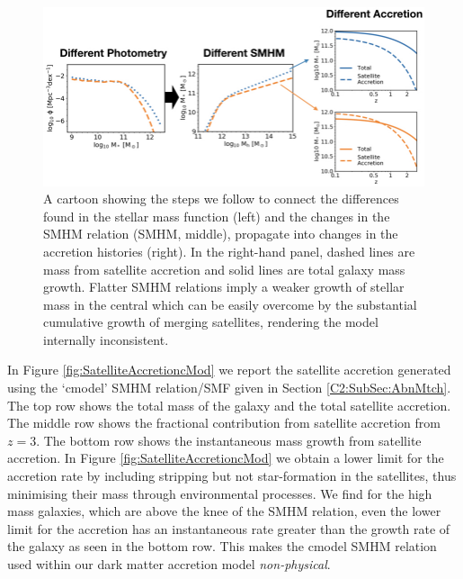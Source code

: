 \begin{figure}[h]
    \centering
    \includegraphics[width = \linewidth]{Figures/Chapter4/SMFtoAccretion.jpeg}
    \caption{A cartoon showing the steps we follow to connect the differences found in the stellar mass function (left) and the changes in the SMHM relation (SMHM, middle), propagate into changes in the accretion histories (right). In the right-hand panel, dashed lines are mass from satellite accretion and solid lines are total galaxy mass growth. Flatter SMHM relations imply a weaker growth of stellar mass in the central which can be easily overcome by the substantial cumulative growth of merging satellites, rendering the model internally inconsistent.}
    \label{fig:SMFtoAcc}
\end{figure}

In Figure \ref{fig:SatelliteAccretioncMod} we report the satellite accretion generated using the `cmodel' SMHM relation/SMF given in Section \ref{C2:SubSec:AbnMtch}. 
The top row shows the total mass of the galaxy and the total satellite accretion. The middle row shows the fractional contribution from satellite accretion from $z = 3$. The bottom row shows the instantaneous mass growth from satellite accretion. In Figure \ref{fig:SatelliteAccretioncMod} we obtain a lower limit for the accretion rate by including stripping but not star-formation in the satellites, thus minimising their mass through environmental processes. We find for the high mass galaxies, which are above the knee of the SMHM relation, even the lower limit for the accretion has an instantaneous rate greater than the growth rate of the galaxy as seen in the bottom row. This makes the cmodel SMHM relation used within our dark matter accretion model \textit{non-physical}.

